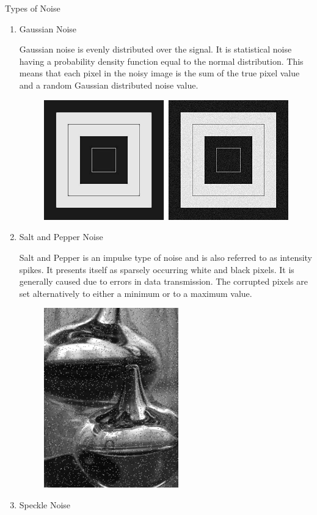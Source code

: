 \documentclass[paper=a4, fontsize=11pt]{scrartcl} %
\numberwithin{equation}{section} %
\numberwithin{figure}{section} %
\numberwithin{table}{section} %
\begin{document}
Types of Noise
\begin{enumerate}
\item Gaussian Noise
  
  Gaussian noise is evenly distributed over the signal. It is statistical noise having a probability density function equal to the normal distribution. This means that each pixel in the noisy image is the sum of the true pixel value and a random Gaussian distributed noise value.
  \begin{figure}[H]
	\centering
	\includegraphics[scale=0.5]{"gaussian"}
        \label{gaussian}
  \end{figure}
\item Salt and Pepper Noise
  
  Salt and Pepper is an impulse type of noise and is also referred to as intensity spikes. It presents itself as sparsely occurring white and black pixels. It is generally caused due to errors in data transmission. The corrupted pixels are set alternatively to either a minimum or to a maximum value.
  \begin{figure}[H]
	\centering
	\includegraphics[scale=0.5]{"salt and pepper"}
        \label{salt}
\end{figure}
\item Speckle Noise
  

\end{enumerate}
\end{document}
